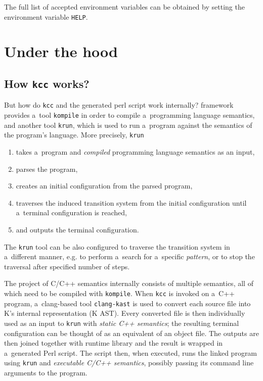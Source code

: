 \documentclass{fithesis3}
\newcommand{\krun}{\texttt{krun}\xspace}
\newcommand{\kompile}{\texttt{kompile}\xspace}
\newcommand{\clangKast}{\texttt{clang-kast}\xspace}
\newcommand{\kcc}{\texttt{kcc}\xspace}
\begin{document}
The full list of accepted environment variables can be obtained by setting the environment variable \texttt{HELP}.




\section{Under the hood}

\subsection{How \kcc works?}

But how do \kcc and the generated perl script work internally? \K framework provides a~tool \kompile in order to compile a~programming language semantics, and another tool \krun, which is used to run a~program against the semantics of the program's language. More precisely, \krun 
\begin{enumerate}
\item takes a~program and \textit{compiled} programming language semantics as an input,
\item parses the program,
\item creates an initial configuration from the parsed program,
\item traverses the induced transition system from the initial configuration until a~terminal configuration is reached,
\item and outputs the terminal configuration.
\end{enumerate}
The \krun tool can be also configured to traverse the transition system in a~different manner, e.g. to perform a~search for a~specific \textit{pattern}, or to stop the traversal after specified number of steps.

The project of C/C++ semantics internally consists of multiple \K semantics, all of which need to be compiled with \kompile. When \kcc is invoked on a~C++ program, a~clang-based tool \clangKast is used to convert each source file into K's internal representation (K AST). Every converted file is then individually used as an input to \krun with \textit{static C++ semantics}; the resulting terminal configuration can be thought of as an equivalent of an object file. The outputs are then joined together with runtime library and the result is wrapped in a~generated Perl script. The script then, when executed, runs the linked program using \krun and \textit{executable C/C++ semantics}, possibly passing its command line arguments to the program.
\end{document}

